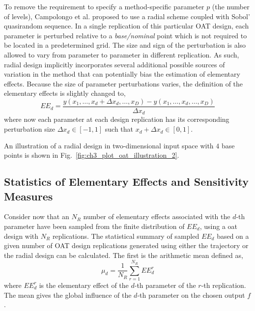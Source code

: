 To remove the requirement to specify a method-specific parameter $p$ (the number of levels),
Campolongo et al.\cite{Campolongo2011} proposed to use a radial scheme coupled with Sobol' quasirandom sequence.
In a single replication of this particular OAT design, 
each parameter is perturbed relative to a \textit{base/nominal} point 
which is not required to be located in a predetermined grid.
The size and sign of the perturbation is also allowed to vary from parameter to parameter in different replication.
As such, radial design implicitly incorporates several additional possible sources of variation in the method 
that can potentially bias the estimation of elementary effects.
Because the size of parameter perturbations varies, the definition of the elementary effects is slightly changed to,
\begin{equation}
EE_d = \frac{y(x_1, \dots, x_d+\Delta x_d,\dots,x_D) - y(x_1, \dots, x_d,\dots,x_D)}{\Delta x_d}
\end{equation}
where now each parameter at each design replication has its corresponding perturbation size $\Delta x_d \in [-1,1]$ such that $x_d + \Delta x_d \in [0,1]$.

An illustration of a radial design in two-dimensional input space with $4$ base points is shown in Fig.~\ref{fig:ch3_plot_oat_illustration_2}.
 
\subsection{Statistics of Elementary Effects and Sensitivity Measures}\label{sub:sa_ee_statistics}

Consider now that an $N_R$ number of elementary effects associated with the $d$-th parameter have been sampled from the finite distribution of $EE_d$,
using a \gls{oat} design with $N_R$ replications.
The statistical summary of sampled $EE_d$ based on a given number of OAT design replications generated using either the trajectory or the radial design can be calculated.
The first is the arithmetic mean defined as,
\begin{equation}
	\mu_d = \frac{1}{N_R} \sum_{r = 1}^{N_R} EE^r_d
	\label{eq:sa_morris_mu}
\end{equation} 
where $EE^r_d$ is the elementary effect of the $d$-th parameter of the $r$-th replication.
The mean gives the global influence of the $d$-th parameter on the chosen output $f$.

